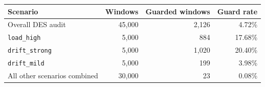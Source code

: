 \begin{tabular}{lrrr}
\toprule
Scenario & Windows & Guarded windows & Guard rate \\
\midrule
Overall DES audit & 45,000 & 2,126 & 4.72\% \\
\texttt{load\_high} & 5,000 & 884 & 17.68\% \\
\texttt{drift\_strong} & 5,000 & 1,020 & 20.40\% \\
\texttt{drift\_mild} & 5,000 & 199 & 3.98\% \\
All other scenarios combined & 30,000 & 23 & 0.08\% \\
\bottomrule
\end{tabular}
